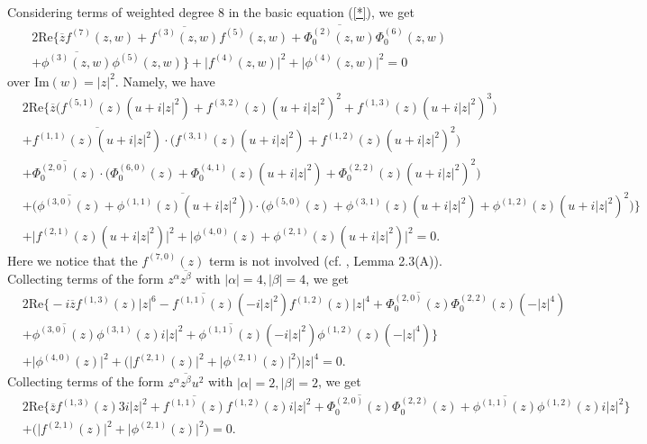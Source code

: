 \documentclass[12pt]{article}
\numberwithin{equation}{section}
\def\a{\alpha}
\def\ov{\overline}
\def\b{\beta}
\def\a{\alpha}
\def\a{\alpha}
\def\b{\beta}
\def\a{\alpha}
\def\a{\alpha}
\begin{document}
Considering terms of weighted degree $8$ in the basic equation
(\ref{*}), we get
\begin{equation}\begin{split}
&2\text{Re}\Big\{\ov{z}f^{(7)}(z,w)+\ov{f^{(3)}(z,w)}f^{(5)}(z,w)+\ov{\Phi_0^{(2)}(z,w)}{\Phi_0^{(6)}(z,w)}\\
&+\ov{\phi^{(3)}(z,w)}{\phi^{(5)}(z,w)}\Big\}
+\big|f^{(4)}(z,w)\big|^2+\big|\phi^{(4)}(z,w)\big|^2=0
\end{split}\end{equation}
over Im$(w)=|z|^2$. Namely, we have
\begin{equation}\begin{split}
&2\text{Re}\Big\{\ov{z}\Big(f^{(5,1)}(z)(u+i|z|^2)+f^{(3,2)}(z)(u+i|z|^2)^2+f^{(1,3)}(z)(u+i|z|^2)^3\Big)\\
&+\ov{f^{(1,1)}(z)(u+i|z|^2)}\cdot\Big(f^{(3,1)}(z)(u+i|z|^2)+f^{(1,2)}(z)(u+i|z|^2)^2\Big)\\
&+\ov{\Phi_0^{(2,0)}(z)}\cdot\Big(\Phi_0^{(6,0)}(z)+\Phi_0^{(4,1)}(z)(u+i|z|^2)+\Phi_0^{(2,2)}(z)(u+i|z|^2)^2\Big)\\
&+\Big(\ov{\phi^{(3,0)}(z)}+\ov{\phi^{(1,1)}(z)(u+i|z|^2)}\Big)\cdot
\Big(\phi^{(5,0)}(z)+\phi^{(3,1)}(z)(u+i|z|^2)+\phi^{(1,2)}(z)(u+i|z|^2)^2\Big)\Big\}\\
&+\Big|f^{(2,1)}(z)(u+i|z|^2)\Big|^2+\Big|\phi^{(4,0)}(z)+\phi^{(2,1)}(z)(u+i|z|^2)\Big|^2=0.
\end{split}\end{equation}
{Here we notice that the $f^{(7,0)}(z)$ term is not involved (cf.
\cite{HJX1}, Lemma 2.3(A)).} Collecting terms of the form
$z^{\a}\ov{z^{\b}}$ with $|\a|=4,|\b|=4$, we get
\begin{equation}\begin{split}\label{97eq3}
&2\text{Re}\Big\{-i\ov{z}f^{(1,3)}(z)|z|^6-\ov{f^{(1,1)}(z)}(-i|z|^2)f^{(1,2)}(z)|z|^4
+\ov{\Phi_0^{(2,0)}(z)}\Phi_0^{(2,2)}(z)(-|z|^4)\\&+
\ov{\phi^{(3,0)}(z)}\phi^{(3,1)}(z)i|z|^2+\ov{\phi^{(1,1)}(z)}(-i|z|^2)\phi^{(1,2)}(z)(-|z|^4)\Big\}\\
&+\big|\phi^{(4,0)}(z)\big|^2+\big(\big|f^{(2,1)}(z)\big|^2+\big|\phi^{(2,1)}(z)\big|^2\big)|z|^4=0.
\end{split}\end{equation}
Collecting terms of the form $z^{\a}\ov{z^{\b}}u^2$ with
$|\a|=2,|\b|=2$, we get
\begin{equation}\begin{split}\label{97eq4}
&2\text{Re}\Big\{\ov{z}f^{(1,3)}(z)3i|z|^2+\ov{f^{(1,1)}(z)}f^{(1,2)}(z)i|z|^2+\ov{\Phi_0^{(2,0)}(z)}\Phi_0^{(2,2)}(z)+
\ov{\phi^{(1,1)}(z)}\phi^{(1,2)}(z)i|z|^2\Big\}\\
&+\big(\big|f^{(2,1)}(z)\big|^2+\big|\phi^{(2,1)}(z)\big|^2\big)=0.
\end{split}\end{equation}
\end{document}
